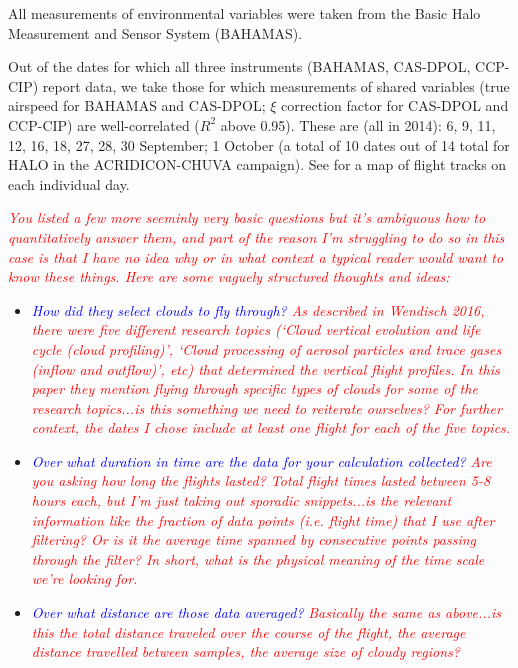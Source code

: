 \documentclass{article}
\newcommand{\drcomm}[1]{\textcolor{blue}{\textit{#1}}}
\newcommand{\klcomm}[1]{\textcolor{red}{\textit{#1}}}
\begin{document}
All measurements of environmental variables were taken from the Basic Halo Measurement and Sensor System (BAHAMAS).

Out of the dates for which all three instruments (BAHAMAS, CAS-DPOL, CCP-CIP) report data, we take those for which measurements of shared variables (true airspeed for BAHAMAS and CAS-DPOL; $\xi$ correction factor for CAS-DPOL and CCP-CIP) are well-correlated ($R^2$ above 0.95). These are (all in 2014): 6, 9, 11, 12, 16, 18, 27, 28, 30 September; 1 October (a total of 10 dates out of 14 total for HALO in the ACRIDICON-CHUVA campaign). See \cite{Wendisch2016} for a map of flight tracks on each individual day.

\klcomm{You listed a few more seeminly very basic questions but it's ambiguous how to quantitatively answer them, and part of the reason I'm struggling to do so in this case is that I have no idea why or in what context a typical reader would want to know these things. Here are some vaguely structured thoughts and ideas:}
\begin{itemize}
\item \drcomm{How did they select clouds to fly through?} \klcomm{As described in Wendisch 2016, there were five different research topics (`Cloud vertical evolution and life cycle (cloud profiling)', `Cloud processing of aerosol particles and trace gases (inflow and outflow)', etc) that determined the vertical flight profiles. In this paper they mention flying through specific types of clouds for some of the research topics...is this something we need to reiterate ourselves? For further context, the dates I chose include at least one flight for each of the five topics.}
\item \drcomm{Over what duration in time are the data for your calculation collected?} \klcomm{Are you asking how long the flights lasted? Total flight times lasted between 5-8 hours each, but I'm just taking out sporadic snippets...is the relevant information like the fraction of data points (i.e. flight time) that I use after filtering? Or is it the average time spanned by consecutive points passing through the filter? In short, what is the physical meaning of the time scale we're looking for.}
\item \drcomm{Over what distance are those data averaged?} \klcomm{Basically the same as above...is this the total distance traveled over the course of the flight, the average distance travelled between samples, the average size of cloudy regions?}
\end{itemize}
\end{document}
